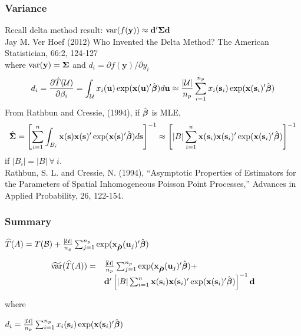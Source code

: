 \documentclass[mathserif,compress]{beamer}\usepackage{graphicx, color}
\def\bd{\mathbf{d}}
\def\bs{\mathbf{s}}
\def\bu{\mathbf{u}}
\def\bx{\mathbf{x}}
\def\by{\mathbf{y}}
\def\cB{\mathcal{B}}
\def\cU{\mathcal{U}}
\def\bbeta{\mbox{\boldmath $\beta$}}
\def\brho{\mbox{\boldmath $\rho$}}
\def\bSigma{\mbox{\boldmath $\Sigma$}}
\def\var{\textrm{var}}
\def\upp{^\prime}
\def\upi{^{-1}}
\begin{document}

\begin{frame}[fragile]
\frametitle{Variance}

Recall delta method result: $\var(f(\by)) \approx \bd\upp\bSigma\bd$ \\
\tiny
Jay M. Ver Hoef (2012) Who Invented the Delta Method? The American Statistician, 66:2, 124-127 \\
\normalsize
where $\var(\by) = \bSigma$ and $d_i = \partial f(\by)/\partial y_i$ \\
\footnotesize
\[
	d_i = \frac{\partial \hat{T}(\cU)}{\partial \beta_i} = \int_{\cU}x_i(\bu)\exp(\bx(\bu)^\prime\hat{\bbeta}) d\bu \approx \frac{|\cU|}{n_p}\sum_{i=1}^{n_p} x_i(\bs_i)\exp(\bx(\bs_i)^\prime\hat{\bbeta})
\]
\normalsize
From Rathbun and Cressie, (1994), if $\hat{\bbeta}$ is MLE,
\footnotesize
\[
\hat{\bSigma}= \left[\sum_{i=1}^n\int_{B_i} \bx(\bs)\bx({\bs})\upp\exp(\bx(\bs)\upp \hat{\bbeta}) d\bs\right]\upi \approx \left[ |B| \sum_{i=1}^{n} \bx(\bs_i)\bx({\bs_i})\upp\exp(\bx(\bs_i)\upp \hat{\bbeta}) \right]\upi
\]
\normalsize
if $|B_i| = |B| \ \forall \ i$. \\
\vspace{.2cm}
\tiny
Rathbun, S. L. and Cressie, N. (1994), ``Asymptotic Properties of Estimators for the Parameters of Spatial Inhomogeneous Poisson Point Processes,'' Advances in Applied Probability, 26, 122-154.

\end{frame}


\begin{frame}[fragile]
\frametitle{Summary}

\begin{center}
$\widehat{T}(A) = T(\cB) + \frac{|\cU|}{n_p}\sum_{j=1}^{n_p}\exp(\bx_{\hat{\brho}}(\bu_j)\upp\hat{\bbeta})$
\end{center} 
\begin{center}
\[
\begin{array}{rl}
\widetilde{\var}(\widehat{T}(A)) = & \frac{|\cU|}{n_p}\sum_{j=1}^{n_p}\exp(\bx_{\hat{\brho}}(\bu_j)\upp\hat{\bbeta}) + \\ & \bd\upp\left[ |B| \sum_{i=1}^{n} \bx(\bs_i)\bx({\bs_i})\upp\exp(\bx(\bs_i)\upp \hat{\bbeta}) \right]\upi\bd
\end{array}
\]
\end{center} 
where \\
\begin{center}
 $d_i = \frac{|\cU|}{n_p}\sum_{i=1}^{n_p} x_i(\bs_i)\exp(\bx(\bs_i)^\prime\hat{\bbeta})$
\end{center}

\end{frame}
\end{document}
